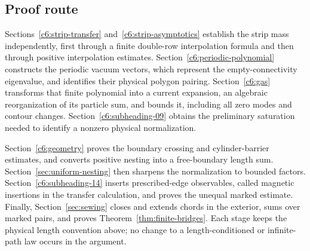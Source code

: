 \subsection{Proof route}

Sections~\ref{c6:strip-transfer} and~\ref{c6:strip-asymptotics} establish the strip mass independently, first through a finite double-row interpolation formula and then through positive interpolation estimates. Section~\ref{c6:periodic-polynomial} constructs the periodic vacuum vectors, which represent the empty-connectivity eigenvalue, and identifies their physical polygon pairing. Section~\ref{c6:gas} transforms that finite polynomial into a current expansion, an algebraic reorganization of its particle sum, and bounds it, including all zero modes and contour changes. Section~\ref{c6:subheading-09} obtains the preliminary saturation needed to identify a nonzero physical normalization.

Section~\ref{c6:geometry} proves the boundary crossing and cylinder-barrier estimates, and converts positive nesting into a free-boundary length sum. Section~\ref{sec:uniform-nesting} then sharpens the normalization to bounded factors. Section~\ref{c6:subheading-14} inserts prescribed-edge observables, called magnetic insertions in the transfer calculation, and proves the unequal marked estimate. Finally, Section~\ref{sec:sewing} closes and extends chords in the exterior, sums over marked pairs, and proves Theorem~\ref{thm:finite-bridges}. Each stage keeps the physical length convention above; no change to a length-conditioned or infinite-path law occurs in the argument.
